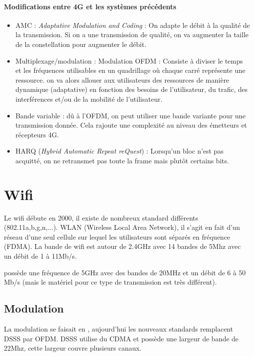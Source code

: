 \subsubsection{Modifications entre 4G et les systèmes précédents}

\begin{itemize}
\item AMC : \textit{Adaptative Modulation and Coding} : On adapte le débit à la qualité de la transmission. Si on a une transmission de qualité, on va augmenter la taille de la constellation pour augmenter le débit.
\item Multiplexage/modulation : Modulation OFDM : Consiste à diviser le temps et les fréquences utilisables en un quadrillage où chaque carré représente une ressource. on va alors allouer aux utilisateurs des ressources de manière dynamique (adaptative) en fonction des besoins de l'utilisateur, du trafic, des interférences et/ou de la mobilité de l'utilisateur.
\item Bande variable : dû à l'OFDM, on peut utiliser une bande variante pour une transmission donnée. Cela rajoute une complexité au niveau des émetteurs et récepteurs 4G.
\item HARQ (\textit{Hybrid Automatic Repeat reQuest}) : Lorsqu'un bloc n'est pas acquitté, on ne retransmet pas toute la frame mais plutôt certains bits.
\end{itemize}

\chapter{Wifi}

Le wifi débute en 2000, il existe de nombreux standard différents (802.11a,b,g,n,...). WLAN (Wireless Local Area Network), il s'agit en fait d'un réseau d'une seul cellule sur lequel les utilisateurs sont séparés en fréquence (FDMA). La bande de wifi est autour de 2.4GHz avec 14 bandes de 5Mhz avec un débit de 1 à 11Mb/s.

 possède une fréquence de 5GHz avec des bandes de 20MHz et un débit de 6 à 50 Mb/s (mais le matériel pour ce type de transmission est très différent).

\section{Modulation}

La modulation se faisait en , aujourd'hui les nouveaux standards remplacent DSSS par OFDM. DSSS utilise du CDMA et possède une largeur de bande de 22Mhz, cette largeur couvre plusieurs canaux.

